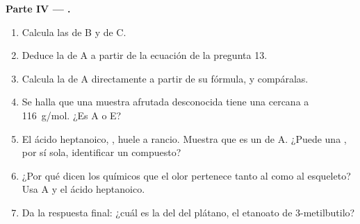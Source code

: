 \begin{problem}
\medskip
\noindent\textbf{Parte IV --- .}
\begin{enumerate}[resume]
  \item Calcula las  de B y de C.
  \item Deduce la  de A a partir de la ecuación de la
        pregunta 13.
  \item Calcula la  de A directamente a partir de su fórmula,
        y compáralas.
  \item Se halla que una muestra afrutada desconocida tiene una  cercana a \qty{116}{g/mol}. ¿Es A o E?
  \item El ácido heptanoico, , huele a rancio.
        Muestra que es un  de A. ¿Puede una , por sí
        sola, identificar un compuesto?
  \item ¿Por qué dicen los químicos que el olor pertenece tanto al  como al esqueleto? Usa A y el ácido heptanoico.
  \item Da la respuesta final: ¿cuál es la  del  del
        plátano, el etanoato de 3-metilbutilo?
\end{enumerate}
\end{problem}
